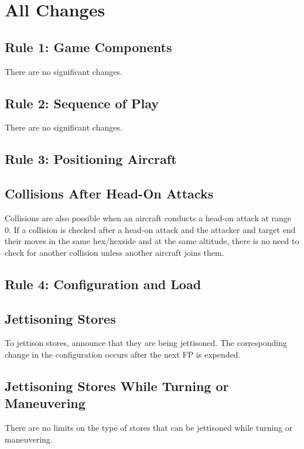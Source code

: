 \documentclass[10pt]{article}
\begin{document}
\section{All Changes}

\subsection{Rule 1: Game Components}

There are no significant changes.

\subsection{Rule 2: Sequence of Play}

There are no significant changes.

\subsection{Rule 3: Positioning Aircraft}

\subsection{Collisions After Head-On Attacks} Collisions are also possible when an aircraft conducts a head-on attack at range 0. If a collision is checked after a head-on attack and the attacker and target end their moves in the same hex/hexside and at the same altitude, there is no need to check for another collision unless another aircraft joins them.

\subsection{Rule 4: Configuration and Load}

\subsection{Jettisoning Stores} To jettison stores, announce that they are being jettisoned. The corresponding change in the configuration occurs after the next FP is expended. 

\subsection{Jettisoning Stores While Turning or Maneuvering} There are no limits on the type of stores that can be jettisoned while turning or maneuvering.
\end{document}
